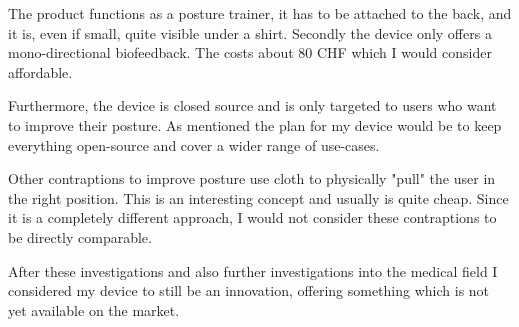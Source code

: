 The product functions as a posture trainer, it has to be attached to the back, and it is, even if small, quite visible under a shirt. Secondly the device only offers a mono-directional biofeedback. \cite{HowToImp2:online} The costs about 80 CHF which I would consider affordable.

Furthermore, the device is closed source and is only targeted to users who want to improve their posture. As mentioned the plan for my device would be to keep everything open-source and cover a wider range of use-cases. 

Other contraptions to improve posture use cloth to physically "pull" the user in the right position. This is an interesting concept and usually is quite cheap. Since it is a completely different approach, I would not consider these contraptions to be directly comparable.

After these investigations and also further investigations into the medical field I considered my device to still be an innovation, offering something which is not yet available on the market.